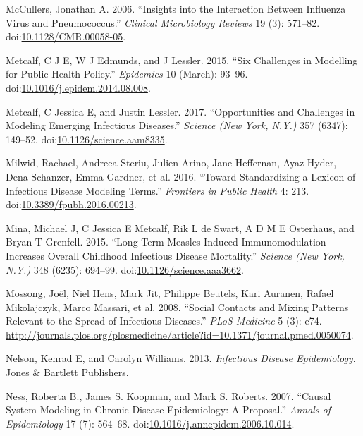 \documentclass[]{book}
\theoremstyle{definition}
\theoremstyle{definition}
\theoremstyle{definition}
\theoremstyle{remark}
\begin{document}
\hypertarget{ref-mccullers06}{}
McCullers, Jonathan A. 2006. ``Insights into the Interaction Between
Influenza Virus and Pneumococcus.'' \emph{Clinical Microbiology Reviews}
19 (3): 571--82.
doi:\href{https://doi.org/10.1128/CMR.00058-05}{10.1128/CMR.00058-05}.

\hypertarget{ref-metcalf15}{}
Metcalf, C J E, W J Edmunds, and J Lessler. 2015. ``Six Challenges in
Modelling for Public Health Policy.'' \emph{Epidemics} 10 (March):
93--96.
doi:\href{https://doi.org/10.1016/j.epidem.2014.08.008}{10.1016/j.epidem.2014.08.008}.

\hypertarget{ref-metcalf17}{}
Metcalf, C Jessica E, and Justin Lessler. 2017. ``Opportunities and
Challenges in Modeling Emerging Infectious Diseases.'' \emph{Science
(New York, N.Y.)} 357 (6347): 149--52.
doi:\href{https://doi.org/10.1126/science.aam8335}{10.1126/science.aam8335}.

\hypertarget{ref-milwid16}{}
Milwid, Rachael, Andreea Steriu, Julien Arino, Jane Heffernan, Ayaz
Hyder, Dena Schanzer, Emma Gardner, et al. 2016. ``Toward Standardizing
a Lexicon of Infectious Disease Modeling Terms.'' \emph{Frontiers in
Public Health} 4: 213.
doi:\href{https://doi.org/10.3389/fpubh.2016.00213}{10.3389/fpubh.2016.00213}.

\hypertarget{ref-mina15}{}
Mina, Michael J, C Jessica E Metcalf, Rik L de Swart, A D M E Osterhaus,
and Bryan T Grenfell. 2015. ``Long-Term Measles-Induced Immunomodulation
Increases Overall Childhood Infectious Disease Mortality.''
\emph{Science (New York, N.Y.)} 348 (6235): 694--99.
doi:\href{https://doi.org/10.1126/science.aaa3662}{10.1126/science.aaa3662}.

\hypertarget{ref-mossong08}{}
Mossong, Joël, Niel Hens, Mark Jit, Philippe Beutels, Kari Auranen,
Rafael Mikolajczyk, Marco Massari, et al. 2008. ``Social Contacts and
Mixing Patterns Relevant to the Spread of Infectious Diseases.''
\emph{PLoS Medicine} 5 (3): e74.
\url{http://journals.plos.org/plosmedicine/article?id=10.1371/journal.pmed.0050074}.

\hypertarget{ref-nelson13}{}
Nelson, Kenrad E, and Carolyn Williams. 2013. \emph{Infectious Disease
Epidemiology}. Jones \& Bartlett Publishers.

\hypertarget{ref-ness07}{}
Ness, Roberta B., James S. Koopman, and Mark S. Roberts. 2007. ``Causal
System Modeling in Chronic Disease Epidemiology: A Proposal.''
\emph{Annals of Epidemiology} 17 (7): 564--68.
doi:\href{https://doi.org/10.1016/j.annepidem.2006.10.014}{10.1016/j.annepidem.2006.10.014}.
\end{document}
